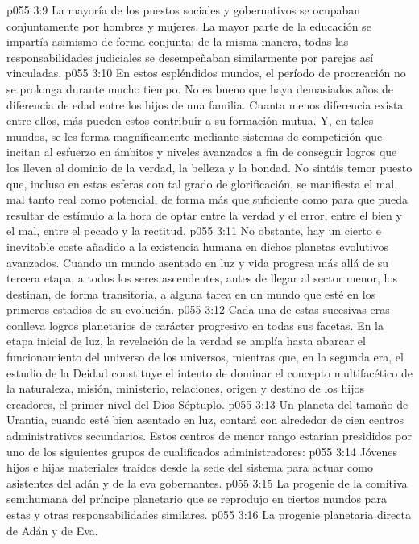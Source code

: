 \vs p055 3:9 La mayoría de los puestos sociales y gobernativos se ocupaban conjuntamente por hombres y mujeres. La mayor parte de la educación se impartía asimismo de forma conjunta; de la misma manera, todas las responsabilidades judiciales se desempeñaban similarmente por parejas así vinculadas.
\vs p055 3:10 \pc En estos espléndidos mundos, el período de procreación no se prolonga durante mucho tiempo. No es bueno que haya demasiados años de diferencia de edad entre los hijos de una familia. Cuanta menos diferencia exista entre ellos, más pueden estos contribuir a su formación mutua. Y, en tales mundos, se les forma magníficamente mediante sistemas de competición que incitan al esfuerzo en ámbitos y niveles avanzados a fin de conseguir logros que los lleven al dominio de la verdad, la belleza y la bondad. No sintáis temor puesto que, incluso en estas esferas con tal grado de glorificación, se manifiesta el mal, mal tanto real como potencial, de forma más que suficiente como para que pueda resultar de estímulo a la hora de optar entre la verdad y el error, entre el bien y el mal, entre el pecado y la rectitud.
\vs p055 3:11 No obstante, hay un cierto e inevitable coste añadido a la existencia humana en dichos planetas evolutivos avanzados. Cuando un mundo asentado en luz y vida progresa más allá de su tercera etapa, a todos los seres ascendentes, antes de llegar al sector menor, los destinan, de forma transitoria, a alguna tarea en un mundo que esté en los primeros estadios de su evolución.
\vs p055 3:12 Cada una de estas sucesivas eras conlleva logros planetarios de carácter progresivo en todas sus facetas. En la etapa inicial de luz, la revelación de la verdad se amplía hasta abarcar el funcionamiento del universo de los universos, mientras que, en la segunda era, el estudio de la Deidad constituye el intento de dominar el concepto multifacético de la naturaleza, misión, ministerio, relaciones, origen y destino de los hijos creadores, el primer nivel del Dios Séptuplo.
\vs p055 3:13 \pc Un planeta del tamaño de Urantia, cuando esté bien asentado en luz, contará con alrededor de cien centros administrativos secundarios. Estos centros de menor rango estarían presididos por uno de los siguientes grupos de cualificados administradores:
\vs p055 3:14 Jóvenes hijos e hijas materiales traídos desde la sede del sistema para actuar como asistentes del adán y de la eva gobernantes.
\vs p055 3:15 La progenie de la comitiva semihumana del príncipe planetario que se reprodujo en ciertos mundos para estas y otras responsabilidades similares.
\vs p055 3:16 La progenie planetaria directa de Adán y de Eva.
